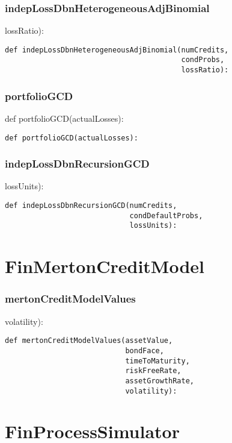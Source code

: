 \documentclass[twoside,11pt]{book}
\begin{document}
\subsubsection*{{\bf indepLossDbnHeterogeneousAdjBinomial}}
lossRatio): 

\begin{lstlisting}
def indepLossDbnHeterogeneousAdjBinomial(numCredits,
                                         condProbs,
                                         lossRatio):
\end{lstlisting}

\subsubsection*{{\bf portfolioGCD}}
def portfolioGCD(actualLosses): 

\begin{lstlisting}
def portfolioGCD(actualLosses):
\end{lstlisting}

\subsubsection*{{\bf indepLossDbnRecursionGCD}}
lossUnits): 

\begin{lstlisting}
def indepLossDbnRecursionGCD(numCredits,
                             condDefaultProbs,
                             lossUnits):
\end{lstlisting}

\newpage
\section{FinMertonCreditModel}

\subsubsection*{{\bf mertonCreditModelValues}}
volatility): 

\begin{lstlisting}
def mertonCreditModelValues(assetValue,
                            bondFace,
                            timeToMaturity,
                            riskFreeRate,
                            assetGrowthRate,
                            volatility):
\end{lstlisting}

\newpage
\section{FinProcessSimulator}
\end{document}
